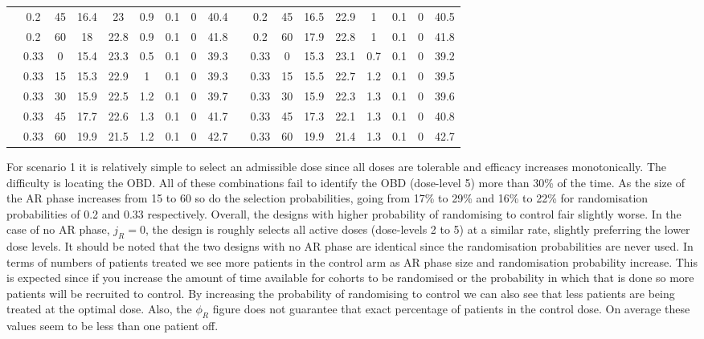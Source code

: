\begin{table}
{\begin{tabular}[t]{cccccccc>{}c|ccccccccc}
			& 0.2 & 45 & 16.4 & 23 & 0.9 & 0.1 & 0 & 40.4 &  & 0.2 & 45 & 16.5 & 22.9 & 1 & 0.1 & 0 & 40.5\\
			
			& 0.2 & 60 & 18 & 22.8 & 0.9 & 0.1 & 0 & 41.8 &  & 0.2 & 60 & 17.9 & 22.8 & 1 & 0.1 & 0 & 41.8\\
			
			& 0.33 & 0 & 15.4 & 23.3 & 0.5 & 0.1 & 0 & 39.3 &  & 0.33 & 0 & 15.3 & 23.1 & 0.7 & 0.1 & 0 & 39.2\\
			
			& 0.33 & 15 & 15.3 & 22.9 & 1 & 0.1 & 0 & 39.3 &  & 0.33 & 15 & 15.5 & 22.7 & 1.2 & 0.1 & 0 & 39.5\\
			
			& 0.33 & 30 & 15.9 & 22.5 & 1.2 & 0.1 & 0 & 39.7 &  & 0.33 & 30 & 15.9 & 22.3 & 1.3 & 0.1 & 0 & 39.6\\
			
			& 0.33 & 45 & 17.7 & 22.6 & 1.3 & 0.1 & 0 & 41.7 &  & 0.33 & 45 & 17.3 & 22.1 & 1.3 & 0.1 & 0 & 40.8\\
			
			\multirow{-10}{*}{\centering\arraybackslash 6} & 0.33 & 60 & 19.9 & 21.5 & 1.2 & 0.1 & 0 & 42.7 & \multirow{-10}{*}{\centering\arraybackslash 12} & 0.33 & 60 & 19.9 & 21.4 & 1.3 & 0.1 & 0 & 42.7\\
			\bottomrule
	\end{tabular}}
\end{table}

For scenario 1 it is relatively simple to select an admissible dose since all doses are tolerable and efficacy increases monotonically. The difficulty is locating the OBD. All of these combinations fail to identify the OBD (dose-level 5) more than 30\% of the time. As the size of the AR phase increases from 15 to 60 so do the selection probabilities, going from 17\% to 29\% and 16\% to 22\% for randomisation probabilities of 0.2 and 0.33 respectively. Overall, the designs with higher probability of randomising to control fair slightly worse. In the case of no AR phase, $j_R =0$, the design is roughly selects all active doses (dose-levels 2 to 5) at a similar rate, slightly preferring the lower dose levels. It should be noted that the two designs with no AR phase are identical since the randomisation probabilities are never used. In terms of numbers of patients treated we see more patients in the control arm as AR phase size and randomisation probability increase. This is expected since if you increase the amount of time available for cohorts to be randomised or the probability in which that is done so more patients will be recruited to control. By increasing the probability of randomising to control we can also see that less patients are being treated at the optimal dose. Also, the $\phi_R$ figure does not guarantee that exact percentage of patients in the control dose. On average these values seem to be less than one patient off. 

